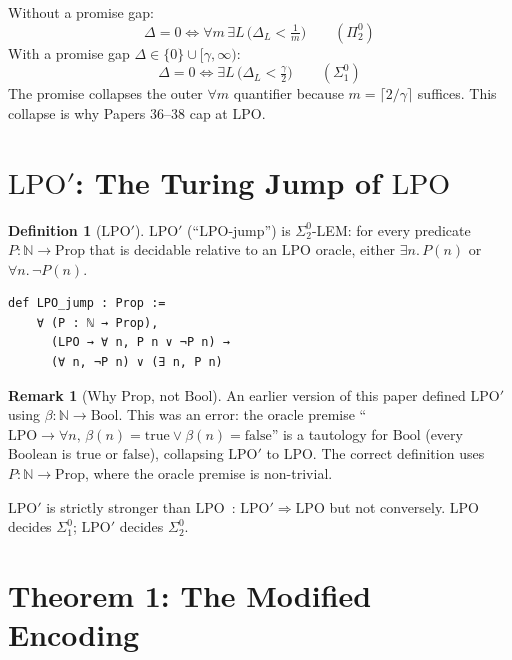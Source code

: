 \documentclass[11pt,a4paper]{article}
\theoremstyle{plain}
\theoremstyle{definition}
\newtheorem{definition}[theorem]{Definition}
\newtheorem{remark}[theorem]{Remark}
\newcommand{\NN}{\mathbb{N}}
\newcommand{\LPO}{\ensuremath{\mathrm{LPO}}}
\newcommand{\LPOj}{\ensuremath{\mathrm{LPO'}}}
\begin{document}
Without a promise gap:
\[
  \Delta = 0 \iff \forall m\, \exists L\,
    \bigl(\Delta_L < \tfrac{1}{m}\bigr) \qquad (\Pi_2^0)
\]
With a promise gap $\Delta \in \{0\} \cup [\gamma,\infty)$:
\[
  \Delta = 0 \iff \exists L\,
    \bigl(\Delta_L < \tfrac{\gamma}{2}\bigr) \qquad (\Sigma_1^0)
\]
The promise collapses the outer $\forall m$ quantifier because
$m = \lceil 2/\gamma \rceil$ suffices.  This collapse is why
Papers 36--38 cap at $\LPO$.

\section{$\LPOj$: The Turing Jump of $\LPO$}\label{sec:lpojump}

\begin{definition}[$\LPOj$]\label{def:lpojump}
$\LPOj$ (``$\LPO$-jump'') is $\Sigma_2^0$-LEM:
for every predicate $P : \NN \to \mathrm{Prop}$ that is decidable
relative to an $\LPO$ oracle, either $\exists n.\, P(n)$ or
$\forall n.\, \lnot P(n)$.
\end{definition}

\begin{lstlisting}[caption={$\LPOj$ definition: \texttt{Defs.lean}}]
def LPO_jump : Prop :=
    ∀ (P : ℕ → Prop),
      (LPO → ∀ n, P n ∨ ¬P n) →
      (∀ n, ¬P n) ∨ (∃ n, P n)
\end{lstlisting}

\begin{remark}[Why $\mathrm{Prop}$, not $\mathrm{Bool}$]\label{rem:prop}
An earlier version of this paper defined $\LPOj$ using
$\beta : \NN \to \mathrm{Bool}$.  This was an error: the oracle
premise ``$\LPO \to \forall n,\, \beta(n) = \mathrm{true} \lor
\beta(n) = \mathrm{false}$'' is a tautology for $\mathrm{Bool}$
(every Boolean is $\mathrm{true}$ or $\mathrm{false}$), collapsing
$\LPOj$ to $\LPO$.  The correct definition uses $P : \NN \to \mathrm{Prop}$,
where the oracle premise is non-trivial.
\end{remark}

$\LPOj$ is strictly stronger than $\LPO$~\cite{BrattkaEtAl2012}:
$\LPOj \Rightarrow \LPO$ but not conversely.
$\LPO$ decides $\Sigma_1^0$; $\LPOj$ decides $\Sigma_2^0$.

\section{Theorem 1: The Modified Encoding}\label{sec:encoding}
\end{document}
